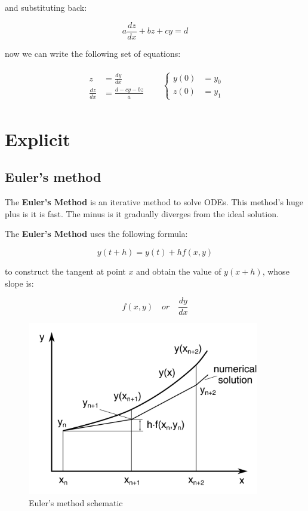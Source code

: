 \documentclass[10pt,b5paper,titlepage]{book}
\newenvironment{eqarray}
{
    \begin{eqnarray}
        \begin{aligned}
}
{
        \end{aligned}
    \end{eqnarray}
}
\begin{document}
and substituting back:

\begin{equation}
    a \frac{dz}{dx} + b z + c y = d
\end{equation}

now we can write the following set of equations:

\begin{eqarray}
    \begin{aligned}
        z &= \frac{dy}{dx}\\
        \frac{dz}{dx} &= \frac{d - c y - b z}{a}
    \end{aligned} &
    \quad \left\{
    \begin{aligned}
        y(0) &= y_0\\
        z(0) &= y_1
    \end{aligned} \right.
\end{eqarray}



\section{Explicit}

\subsection{Euler's method}
The \textbf{Euler's Method} is an iterative method to solve ODEs. This method's
huge plus is it is fast. The minus is it gradually diverges from the ideal solution.

The \textbf{Euler's Method} uses the following formula:

\begin{equation}
    y(t + h) = y(t) + h f(x,y)
\end{equation}

to construct the tangent at point $ x $ and obtain the value of $ y(x + h) $,
whose slope is:

\begin{equation}
    f(x,y) \quad or \quad \frac{dy}{dx}
\end{equation}

\begin{figure}[ht]
    \centering
    \includegraphics[width=0.90\textwidth]{img/Euler.png}
    \caption{Euler's method schematic}
    \label{fig:euler-png}
\end{figure}
\end{document}
